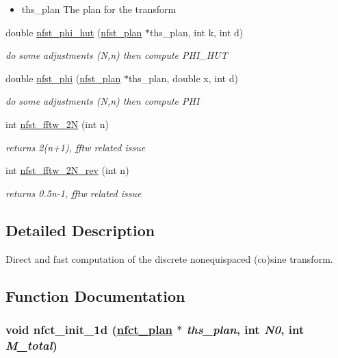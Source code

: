 \begin{CompactItemize}
\begin{CompactList}\small\item\em \begin{itemize}
\item ths\_\-plan The plan for the transform \end{itemize}
\item\end{CompactList}\item 
double \hyperlink{group__nfsct_ga28}{nfst\_\-phi\_\-hut} (\hyperlink{structnfst__plan}{nfst\_\-plan} $\ast$ths\_\-plan, int k, int d)
\begin{CompactList}\small\item\em do some adjustments (N,n) then compute PHI\_\-HUT \item\end{CompactList}\item 
double \hyperlink{group__nfsct_ga29}{nfst\_\-phi} (\hyperlink{structnfst__plan}{nfst\_\-plan} $\ast$ths\_\-plan, double x, int d)
\begin{CompactList}\small\item\em do some adjustments (N,n) then compute PHI \item\end{CompactList}\item 
int \hyperlink{group__nfsct_ga30}{nfst\_\-fftw\_\-2N} (int n)
\begin{CompactList}\small\item\em returns 2(n+1), fftw related issue \item\end{CompactList}\item 
int \hyperlink{group__nfsct_ga31}{nfst\_\-fftw\_\-2N\_\-rev} (int n)
\begin{CompactList}\small\item\em returns 0.5n-1, fftw related issue \item\end{CompactList}\end{CompactItemize}


\subsection{Detailed Description}
Direct and fast computation of the discrete nonequispaced (co)sine transform. 



\subsection{Function Documentation}
\hypertarget{group__nfsct_ga0}{
\subsubsection[nfct\_\-init\_\-1d]{\setlength{\rightskip}{0pt plus 5cm}void nfct\_\-init\_\-1d (\hyperlink{structnfct__plan}{nfct\_\-plan} $\ast$ {\em ths\_\-plan}, int {\em N0}, int {\em M\_\-total})}}
\label{group__nfsct_ga0}



